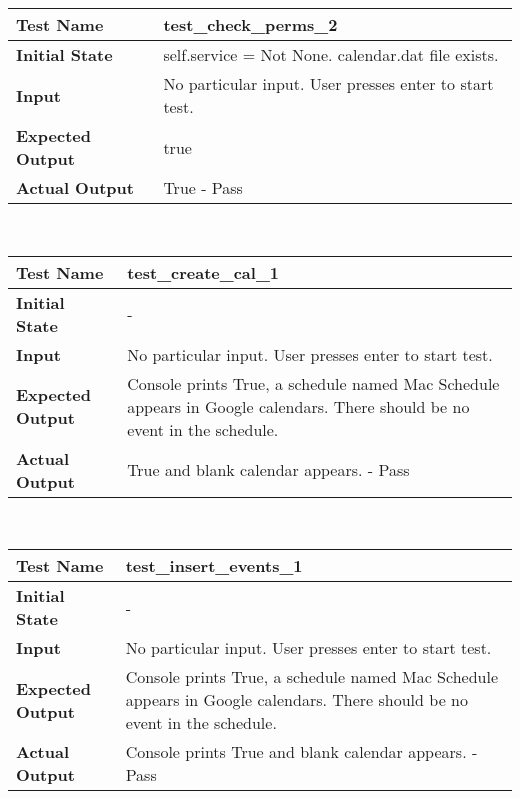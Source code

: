 \documentclass[12pt, titlepage]{article}
\begin{document}
            \hfill	%
		\begin{table}[!htbp]	        
			\begin{tabularx}{\textwidth}{|l|X|}%
				\hline
                \textbf{Test Name} & test\_check\_perms\_2
                \\\hline
                \textbf{Initial State} & self.service = Not None. calendar.dat file exists.
                \\\hline
                \textbf{Input} & No particular input. User presses enter to start test.
                \\\hline 
                \textbf{Expected Output} & true
                \\\hline
                \textbf{Actual Output} & True - Pass
                \\\hline
			\end{tabularx}\\ %
    	\end{table}	
            \hfill	%
 		\begin{table}[!htbp]          
			\begin{tabularx}{\textwidth}{|l|X|}%
				\hline
                \textbf{Test Name} & test\_create\_cal\_1
                \\\hline
                \textbf{Initial State} & -
                \\\hline
                \textbf{Input} & No particular input. User presses enter to start test.
                \\\hline 
                \textbf{Expected Output} & Console prints True, a schedule named Mac Schedule appears in Google calendars. There should be no event in the schedule.
                \\\hline
                \textbf{Actual Output} & True and blank calendar appears. - Pass
                \\\hline
			\end{tabularx}\\ %
    	\end{table}	
            \hfill	%
		\begin{table}[!htbp]
			\begin{tabularx}{\textwidth}{|l|X|}%
				\hline
                \textbf{Test Name} & test\_insert\_events\_1
                \\\hline
                \textbf{Initial State} & -
                \\\hline
                \textbf{Input} & No particular input. User presses enter to start test.
                \\\hline 
                \textbf{Expected Output} & Console prints True, a schedule named Mac Schedule appears in Google calendars. There should be no event in the schedule.
                \\\hline
                \textbf{Actual Output} & Console prints True and blank calendar appears. - Pass
                \\\hline
			\end{tabularx}\\ %
    	\end{table}	
\end{document}
